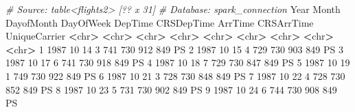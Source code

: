 \documentclass[]{book}
\newenvironment{Shaded}{\begin{snugshade}}{\end{snugshade}}
\newcommand{\DecValTok}[1]{\textcolor[rgb]{0.00,0.00,0.81}{#1}}
\newcommand{\StringTok}[1]{\textcolor[rgb]{0.31,0.60,0.02}{#1}}
\newcommand{\CommentTok}[1]{\textcolor[rgb]{0.56,0.35,0.01}{\textit{#1}}}
\newcommand{\OperatorTok}[1]{\textcolor[rgb]{0.81,0.36,0.00}{\textbf{#1}}}
\newcommand{\ErrorTok}[1]{\textcolor[rgb]{0.64,0.00,0.00}{\textbf{#1}}}
\newcommand{\NormalTok}[1]{#1}
\theoremstyle{definition}
\theoremstyle{definition}
\theoremstyle{definition}
\theoremstyle{remark}
\begin{document}
\begin{Shaded}
\begin{Highlighting}[]
\CommentTok{# Source:   table<flights2> [?? x 31]}
\CommentTok{# Database: spark_connection}
\NormalTok{    Year Month DayofMonth DayOfWeek DepTime CRSDepTime ArrTime CRSArrTime UniqueCarrier}
   \OperatorTok{<}\NormalTok{chr}\OperatorTok{>}\StringTok{ }\ErrorTok{<}\NormalTok{chr}\OperatorTok{>}\StringTok{      }\ErrorTok{<}\NormalTok{chr}\OperatorTok{>}\StringTok{     }\ErrorTok{<}\NormalTok{chr}\OperatorTok{>}\StringTok{   }\ErrorTok{<}\NormalTok{chr}\OperatorTok{>}\StringTok{      }\ErrorTok{<}\NormalTok{chr}\OperatorTok{>}\StringTok{   }\ErrorTok{<}\NormalTok{chr}\OperatorTok{>}\StringTok{      }\ErrorTok{<}\NormalTok{chr}\OperatorTok{>}\StringTok{         }\ErrorTok{<}\NormalTok{chr}\OperatorTok{>}
\StringTok{ }\DecValTok{1}  \DecValTok{1987}    \DecValTok{10}         \DecValTok{14}         \DecValTok{3}     \DecValTok{741}        \DecValTok{730}     \DecValTok{912}        \DecValTok{849}\NormalTok{            PS}
 \DecValTok{2}  \DecValTok{1987}    \DecValTok{10}         \DecValTok{15}         \DecValTok{4}     \DecValTok{729}        \DecValTok{730}     \DecValTok{903}        \DecValTok{849}\NormalTok{            PS}
 \DecValTok{3}  \DecValTok{1987}    \DecValTok{10}         \DecValTok{17}         \DecValTok{6}     \DecValTok{741}        \DecValTok{730}     \DecValTok{918}        \DecValTok{849}\NormalTok{            PS}
 \DecValTok{4}  \DecValTok{1987}    \DecValTok{10}         \DecValTok{18}         \DecValTok{7}     \DecValTok{729}        \DecValTok{730}     \DecValTok{847}        \DecValTok{849}\NormalTok{            PS}
 \DecValTok{5}  \DecValTok{1987}    \DecValTok{10}         \DecValTok{19}         \DecValTok{1}     \DecValTok{749}        \DecValTok{730}     \DecValTok{922}        \DecValTok{849}\NormalTok{            PS}
 \DecValTok{6}  \DecValTok{1987}    \DecValTok{10}         \DecValTok{21}         \DecValTok{3}     \DecValTok{728}        \DecValTok{730}     \DecValTok{848}        \DecValTok{849}\NormalTok{            PS}
 \DecValTok{7}  \DecValTok{1987}    \DecValTok{10}         \DecValTok{22}         \DecValTok{4}     \DecValTok{728}        \DecValTok{730}     \DecValTok{852}        \DecValTok{849}\NormalTok{            PS}
 \DecValTok{8}  \DecValTok{1987}    \DecValTok{10}         \DecValTok{23}         \DecValTok{5}     \DecValTok{731}        \DecValTok{730}     \DecValTok{902}        \DecValTok{849}\NormalTok{            PS}
 \DecValTok{9}  \DecValTok{1987}    \DecValTok{10}         \DecValTok{24}         \DecValTok{6}     \DecValTok{744}        \DecValTok{730}     \DecValTok{908}        \DecValTok{849}\NormalTok{            PS}

\end{Highlighting}
\end{Shaded}
\end{document}
